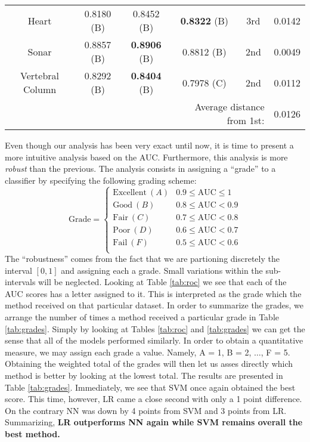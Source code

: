 \documentclass{INGUADY}
\begin{document}
\begin{body}
\begin{table*}
\begin{tabular}{c|ccc|cc}
Heart                           & 0.8180  (B)               & 0.8452    (B)                 & \textbf{0.8322} (B)       & 3rd                   & 0.0142 \\
Sonar                           & 0.8857  (B)               & \textbf{0.8906} (B)       & 0.8812 (B)                    & 2nd                   & 0.0049 \\
Vertebral Column        & 0.8292  (B)               & \textbf{0.8404} (B)       & 0.7978     (C)                    & 2nd                   & 0.0112 \\
\midrule
& & & \multicolumn{2}{r}{Average distance from 1st: } & 0.0126 \\
\bottomrule
\end{tabular}
\label{tab:roc}
\end{table*}
Even though our analysis has been very exact until now, it is time to present a more intuitive analysis based on the AUC. Furthermore, this analysis is more \textit{robust} than the previous. The analysis consists in assigning a ``grade'' to a classifier by specifying the following grading scheme:
\[
\text{Grade} = 
\begin{cases}
\text{Excellent} \ (A) & 0.9 \leq \text{AUC}  \leq 1 \\
\text{Good} \ (B) & 0.8 \leq \text{AUC} < 0.9 \\
\text{Fair} \ (C) & 0.7 \leq \text{AUC} < 0.8 \\
\text{Poor} \  (D) & 0.6 \leq \text{AUC} < 0.7 \\
\text{Fail} \ (F) & 0.5 \leq \text{AUC} < 0.6 \\
\end{cases}
\]
The ``robustness'' comes from the fact that we are partioning discretely the interval $[0, 1]$ and assigning each a grade. Small variations within the sub-intervals will be neglected. Looking at Table \ref{tab:roc} we see that each of the AUC scores has a letter assigned to it. This is interpreted as the grade which the method received on that particular dataset. In order to summarize the grades, we arrange the number of times a method received a particular grade in Table \ref{tab:grades}. Simply by looking at Tables \ref{tab:roc} and \ref{tab:grades} we can get the sense that all of the models performed similarly. In order to obtain a quantitative measure, we may assign each grade a value. Namely, A = 1, B = 2, $\ldots$, F = 5. Obtaining the weighted total of the grades will then let us asses directly which method is better by looking at the lowest total. The results are presented in Table \ref{tab:grades}. Immediately, we see that SVM once again obtained the best score. This time, however, LR came a close second  with only a 1 point difference. On the contrary NN was down by 4 points from SVM and 3 points from LR. Summarizing, \textbf{LR outperforms NN again while SVM remains overall the best method.}


\end{body}
\end{document}
